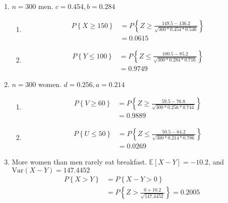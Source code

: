 \begin{enumerate}
	
	\item $ n = 300 $ men. $ c = 0.454, b = 0.284 $ \\
	
		\begin{enumerate}
			\item 			
			\begin{align}
				P \left\{X \geq 150 \right\} &= P \left\{Z \geq \frac{149.5 - 136.2}{\sqrt{300*0.454*0.546}} \right\} \nonumber \\
				&= 0.0615
			\end{align}
			
			\item 
			\begin{align}
				P \left\{Y \leq 100 \right\} &= P \left\{Z \leq \frac{100.5 - 85.2}{\sqrt{300*0.284*0.716}} \right\} \nonumber \\
				&= 0.9749
			\end{align}
			
		\end{enumerate}
	
	
	\item $ n = 300 $ women. $ d = 0.256, a = 0.214 $ \\
	
		\begin{enumerate}
			\item 			
			\begin{align}
				P \left\{V \geq 60 \right\} &= P \left\{Z \geq \frac{59.5 - 76.8}{\sqrt{300*0.256*0.744}} \right\} \nonumber \\
				&= 0.9889
			\end{align}
			
			\item 
			\begin{align}
				P \left\{U \leq 50 \right\} &= P \left\{Z \leq \frac{50.5 - 64.2}{\sqrt{300*0.214*0.786}} \right\} \nonumber \\
				&= 0.0269
			\end{align}
			
		\end{enumerate}
	
	
	\item More women than men rarely eat breakfast.
	$ \mathbb{E}[X-Y] = -10.2 $, and $\mathrm{Var}(X-Y) = 147.4452$\\
	
		\begin{align}
			P \left\{X > Y \right\} &= P \left\{ X - Y > 0 \right\} \nonumber \\
			&= P \left\{ Z > \frac{0 + 10.2}{\sqrt{147.4452}}  \right\} = 0.2005
		\end{align}
	

\end{enumerate}
